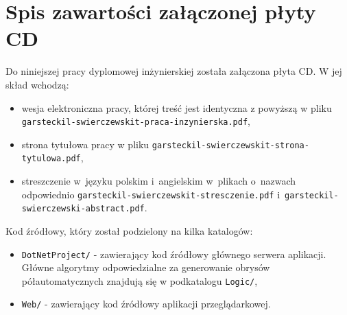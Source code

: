 \documentclass[a4paper,11pt,twoside,openright]{report}
\newcommand\blankpage{%
    \null
    \thispagestyle{empty}%
    \newpage}
\theoremstyle{definition}
\begin{document}


\afterpage{\blankpage}

\listoffigures
{}


\afterpage{\blankpage}




\chapter*{Spis zawartości załączonej płyty CD}

Do niniejszej pracy dyplomowej inżynierskiej została załączona płyta CD. W jej skład wchodzą:
\begin{itemize}[noitemsep]
\item wesja elektroniczna pracy, której treść jest identyczna z powyższą w
pliku \verb+garsteckil-swierczewskit-praca-inzynierska.pdf+,
\item strona tytułowa pracy w pliku \verb+garsteckil-swierczewskit-strona-tytulowa.pdf+,
\item streszczenie w~języku polskim i~angielskim w~plikach o~nazwach odpowiednio
\verb+garsteckil-swierczewskit-stresczenie.pdf+ i~\verb+garsteckil-swierczewski-abstract.pdf+.
\end{itemize}

Kod źródłowy, który został podzielony na kilka katalogów:
\begin{itemize}
\item \verb+DotNetProject/+ - zawierający kod źródłowy głównego serwera aplikacji.
Główne algorytmy odpowiedzialne za generowanie obrysów półautomatycznych znajdują się w podkatalogu \verb+Logic/+,
\item \verb+Web/+ - zawierający kod źródłowy aplikacji przeglądarkowej.
\end{itemize}

\afterpage{\blankpage}

\end{document}
